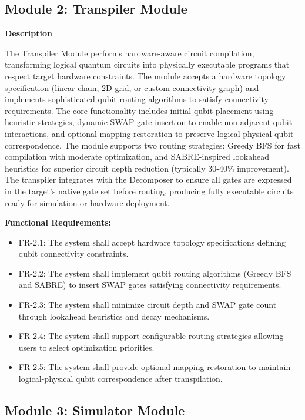 \subsection{Module 2: Transpiler Module}

\textbf{Description}

The Transpiler Module performs hardware-aware circuit compilation, transforming logical quantum circuits into physically executable programs that respect target hardware constraints. The module accepts a hardware topology specification (linear chain, 2D grid, or custom connectivity graph) and implements sophisticated qubit routing algorithms to satisfy connectivity requirements. The core functionality includes initial qubit placement using heuristic strategies, dynamic SWAP gate insertion to enable non-adjacent qubit interactions, and optional mapping restoration to preserve logical-physical qubit correspondence. The module supports two routing strategies: Greedy BFS for fast compilation with moderate optimization, and SABRE-inspired lookahead heuristics for superior circuit depth reduction (typically 30-40\% improvement). The transpiler integrates with the Decomposer to ensure all gates are expressed in the target's native gate set before routing, producing fully executable circuits ready for simulation or hardware deployment.

\textbf{Functional Requirements:}

\begin{itemize}
    \item FR-2.1: The system shall accept hardware topology specifications defining qubit connectivity constraints.
    \item FR-2.2: The system shall implement qubit routing algorithms (Greedy BFS and SABRE) to insert SWAP gates satisfying connectivity requirements.
    \item FR-2.3: The system shall minimize circuit depth and SWAP gate count through lookahead heuristics and decay mechanisms.
    \item FR-2.4: The system shall support configurable routing strategies allowing users to select optimization priorities.
    \item FR-2.5: The system shall provide optional mapping restoration to maintain logical-physical qubit correspondence after transpilation.
\end{itemize}



\subsection{Module 3: Simulator Module}

